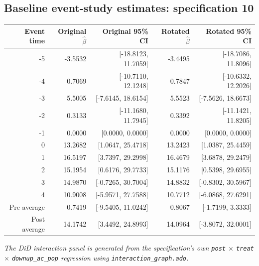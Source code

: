 \documentclass[10pt]{article}
\begin{document}
\subsection*{Baseline event-study estimates: specification 10}
\begin{center}
\scriptsize
\begin{tabular}{r rr rr}
\toprule
Event time & Original $\hat\beta$ & Original 95\% CI & Rotated $\hat\beta$ & Rotated 95\% CI \\
\midrule
-5 & -3.5532 & [-18.8123, 11.7059] & -3.4495 & [-18.7086, 11.8096] \\
-4 & 0.7069 & [-10.7110, 12.1248] & 0.7847 & [-10.6332, 12.2026] \\
-3 & 5.5005 & [-7.6145, 18.6154] & 5.5523 & [-7.5626, 18.6673] \\
-2 & 0.3133 & [-11.1680, 11.7945] & 0.3392 & [-11.1421, 11.8205] \\
-1 & 0.0000 & [0.0000, 0.0000] & 0.0000 & [0.0000, 0.0000] \\
0 & 13.2682 & [1.0647, 25.4718] & 13.2423 & [1.0387, 25.4459] \\
1 & 16.5197 & [3.7397, 29.2998] & 16.4679 & [3.6878, 29.2479] \\
2 & 15.1954 & [0.6176, 29.7733] & 15.1176 & [0.5398, 29.6955] \\
3 & 14.9870 & [-0.7265, 30.7004] & 14.8832 & [-0.8302, 30.5967] \\
4 & 10.9008 & [-5.9571, 27.7588] & 10.7712 & [-6.0868, 27.6291] \\
\midrule
Pre average & 0.7419 & [-9.5405, 11.0242] & 0.8067 & [-1.7199, 3.3333] \\
Post average & 14.1742 & [3.4492, 24.8993] & 14.0964 & [-3.8072, 32.0001] \\
\bottomrule
\end{tabular}
\end{center}
\medskip
\textit{The DiD interaction panel is generated from the specification's own \texttt{post} $\times$ \texttt{treat} $\times$ \texttt{downup\_ac\_pop} regression using \texttt{interaction\_graph.ado}.}
\clearpage
\end{document}
